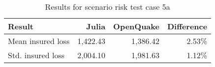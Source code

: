 \begin{table}[htbp]

\centering
\begin{tabular}{ l r r r }

\hline
\rowcolor{anti-flashwhite}
\bf{Result} & \bf{Julia} & \bf{OpenQuake} & \bf{Difference}\\
\hline
Mean insured loss & 1,422.43 & 1,386.42 & 2.53\% \\
Std. insured loss & 2,004.10 & 1,981.63 & 1.12\% \\
\hline
\end{tabular}

\caption{Results for scenario risk test case 5a}
\label{tab:result-sr-5a}
\end{table}